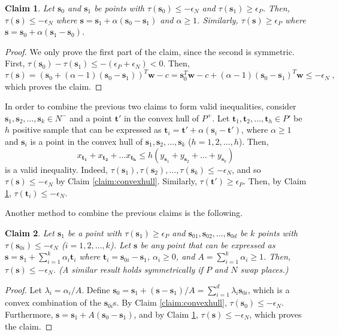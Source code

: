 \documentclass[11pt]{article}
\newtheorem{claim}{Claim}[section]
\theoremstyle{definition}
\newcommand{\vect}[1]{\mathbf{#1}}
\newcommand{\sv}[1]{_{\vect{#1}}}
\begin{document}
\begin{claim}
\label{claim:obstruction}
Let $\vect{s}_0$ and $\vect{s}_1$ be points with 
$\tau(\vect{s}_0) \leq - \epsilon_N$ and
$\tau(\vect{s}_1) \geq \epsilon_P$.
Then, $\tau(\vect{s}) \leq - \epsilon_N$ where
$\vect{s} = \vect{s}_1 + \alpha (\vect{s}_0 - \vect{s}_1)$
and $\alpha \geq 1$.
Similarly,
$\tau(\vect{s}) \geq \epsilon_P$ where
$\vect{s} = \vect{s}_0 + \alpha (\vect{s}_1 - \vect{s}_0)$.
\end{claim}
\begin{proof}
We only prove the first part of the claim, since the second is symmetric.
First,
$\tau(\vect{s}_0) - \tau(\vect{s}_1) \leq - (\epsilon_P + \epsilon_N) < 0$.
Then,
$$\tau(\vect{s}) = 
(\vect{s}_0 + (\alpha - 1) (\vect{s}_0 - \vect{s}_1))^T \vect{w} - c =
\vect{s}_0^T \vect{w} - c + (\alpha - 1) (\vect{s}_0 - \vect{s}_1)^T \vect{w} \leq
- \epsilon_N\;,$$
which proves the claim.
\end{proof}
In order to combine the previous two claims to form valid inequalities,
consider $\vect{s}_1, \vect{s}_2, \dots, \vect{s}_k \in N^-$ and 
a point $\vect{t}'$ in the convex hull of $P^+$.
Let $\vect{t}_1, \vect{t}_2, \dots, \vect{t}_h \in P'$ be 
$h$ positive sample that can be expressed as
$\vect{t}_i = \vect{t}' + \alpha (\vect{s}_i - \vect{t}')$,
where $\alpha \geq 1$ and $\vect{s}_i$ is a point in the convex hull of
$\vect{s}_1, \vect{s}_2, \dots, \vect{s}_k$ ($h = 1, 2, \dots, h$).
Then, 
$$x\sv{t_1} + x\sv{t_2} + \dots x\sv{t_h} \leq 
h (y_{\vect{s}_1} + y_{\vect{s}_2} + \dots + y_{\vect{s}_k})$$
is a valid inequality.
Indeed, 
$\tau(\vect{s}_1), \tau(\vect{s}_2), \dots, \tau(\vect{s}_k) \leq - \epsilon_N$,
and so $\tau(\vect{s}) \leq - \epsilon_N$ by Claim \ref{claim:convexhull}.
Similarly, $\tau(\vect{t}') \geq \epsilon_P$.
Then, by Claim \ref{claim:obstruction}, $\tau(\vect{t}_i) \leq -\epsilon_N$.

Another method to combine the previous claims is the following.
\begin{claim}
\label{claim:basisprojection}
Let $\vect{s}_1$ be a point with $\tau(\vect{s}_1) \geq \epsilon_P$
and $\vect{s}_{01}, \vect{s}_{02}, \dots , \vect{s}_{0d}$ be $k$ points with 
$\tau(\vect{s}_{0i}) \leq - \epsilon_N$ ($i = 1, 2, \dots , k$).
Let $\vect{s}$ be any point that can be expressed as 
$\vect{s} = \vect{s}_1 + \sum_{i = 1}^k \alpha_i \vect{t}_i$ 
where $\vect{t}_i = \vect{s}_{0i} - \vect{s}_1$, 
$\alpha_i \geq 0$, and $A = \sum_{i = 1}^k \alpha_i \geq 1$.
Then, $\tau(\vect{s}) \leq - \epsilon_N$.
(A similar result holds symmetrically if $P$ and $N$ swap places.)
\end{claim}
\begin{proof}
Let $\lambda_i = \alpha_i / A$. 
Define
$\vect{s}_0 =
\vect{s}_1 + (\vect{s} - \vect{s}_1) / A = 
\sum_{i = 1}^d \lambda_i \vect{s}_{0i}$,
which is a convex combination of the $\vect{s}_{0i}$s.
By Claim \ref{claim:convexhull}, $\tau(\vect{s}_0)  \leq - \epsilon_N$.
Furthermore,
$\vect{s} = \vect{s}_1 + A (\vect{s}_0 - \vect{s}_1)$,
and by Claim \ref{claim:obstruction}, $\tau(\vect{s})  \leq - \epsilon_N$,
which proves the claim.
\end{proof}
\fi
\end{document}
